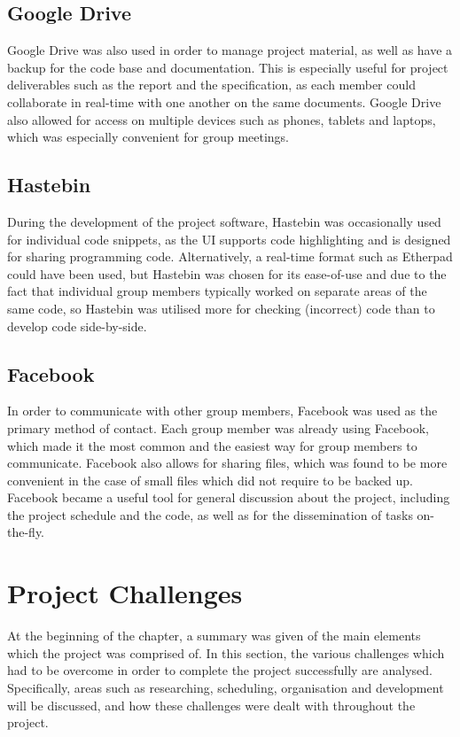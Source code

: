 \subsection{Google Drive}
Google Drive was also used in order to manage project material, as well as have a backup for the code base and documentation. This is especially useful for project deliverables such as the report and the specification, as each member could collaborate in real-time with one another on the same documents. Google Drive also allowed for access on multiple devices such as phones, tablets and laptops, which was especially convenient for group meetings.

\subsection{Hastebin}
During the development of the project software, Hastebin was occasionally used for individual code snippets, as the UI supports code highlighting and is designed for sharing programming code. Alternatively, a real-time format such as Etherpad could have been used, but Hastebin was chosen for its ease-of-use and due to the fact that individual group members typically worked on separate areas of the same code, so Hastebin was utilised more for checking (incorrect) code than to develop code side-by-side.

\subsection{Facebook}
In order to communicate with other group members, Facebook was used as the primary method of contact. Each group member was already using Facebook, which made it the most common and the easiest way for group members to communicate. Facebook also allows for sharing files, which was found to be more convenient in the case of small files which did not require to be backed up. Facebook became a useful tool for general discussion about the project, including the project schedule and the code, as well as for the dissemination of tasks on-the-fly.

\section{Project Challenges}
At the beginning of the chapter, a summary was given of the main elements which the project was comprised of. In this section, the various challenges which had to be overcome in order to complete the project successfully are analysed. Specifically, areas such as researching, scheduling, organisation and development will be discussed, and how these challenges were dealt with throughout the project. 

